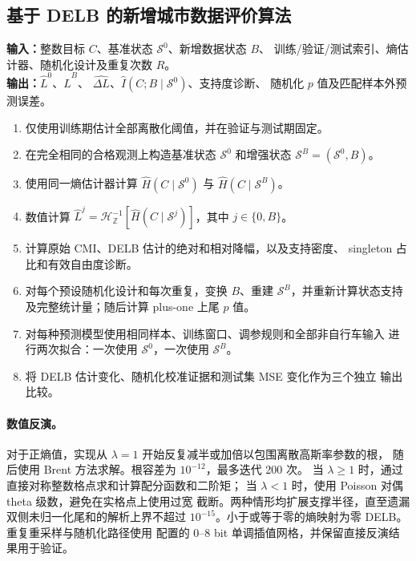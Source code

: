 \subsection{基于 DELB 的新增城市数据评价算法}
\label{subsec:delb_evaluation_algorithm}

\begin{Algorithm}
\label{alg:delb_evaluation}
\textbf{输入：}整数目标 \(C\)、基准状态 \(\mathcal S^0\)、新增数据状态 \(B\)、
训练/验证/测试索引、熵估计器、随机化设计及重复次数 \(R\)。\\
\textbf{输出：}\(\widehat L^0\)、\(\widehat L^B\)、
\(\widehat{\Delta L}\)、\(\widehat I(C;B\mid\mathcal S^0)\)、支持度诊断、
随机化 \(p\) 值及匹配样本外预测误差。
\begin{enumerate}
    \item 仅使用训练期估计全部离散化阈值，并在验证与测试期固定。
    \item 在完全相同的合格观测上构造基准状态 \(\mathcal S^0\) 和增强状态
    \(\mathcal S^B=(\mathcal S^0,B)\)。
    \item 使用同一熵估计器计算 \(\widehat H(C\mid\mathcal S^0)\) 与
    \(\widehat H(C\mid\mathcal S^B)\)。
    \item 数值计算
    \(\widehat L^j=\mathcal H_{\mathbb Z}^{-1}
    [\widehat H(C\mid\mathcal S^j)]\)，其中 \(j\in\{0,B\}\)。
    \item 计算原始 CMI、DELB 估计的绝对和相对降幅，以及支持密度、
    singleton 占比和有效自由度诊断。
    \item 对每个预设随机化设计和每次重复，变换 \(B\)、重建
    \(\mathcal S^B\)，并重新计算状态支持及完整统计量；随后计算 plus-one
    上尾 \(p\) 值。
    \item 对每种预测模型使用相同样本、训练窗口、调参规则和全部非自行车输入
    进行两次拟合：一次使用 \(\mathcal S^0\)，一次使用 \(\mathcal S^B\)。
    \item 将 DELB 估计变化、随机化校准证据和测试集 MSE 变化作为三个独立
    输出比较。
\end{enumerate}
\end{Algorithm}

\paragraph{数值反演。}
对于正熵值，实现从 \(\lambda=1\) 开始反复减半或加倍以包围离散高斯率参数的根，
随后使用 Brent 方法求解。根容差为 \(10^{-12}\)，最多迭代 200 次。
当 \(\lambda\geq1\) 时，通过直接对称整数格点求和计算配分函数和二阶矩；
当 \(\lambda<1\) 时，使用 Poisson 对偶 theta 级数，避免在实格点上使用过宽
截断。两种情形均扩展支撑半径，直至遗漏双侧未归一化尾和的解析上界不超过
\(10^{-15}\)。小于或等于零的熵映射为零 DELB。重复重采样与随机化路径使用
配置的 0--8 bit 单调插值网格，并保留直接反演结果用于验证。

